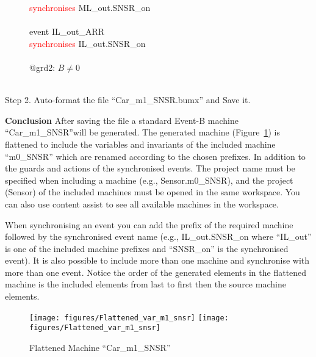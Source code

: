 \begin{description}
\begin{center}
\begin{Bcode}
			\Btab \textcolor{red}{synchronises} ML_out.SNSR_on\\
			\Btab \Bend\\
			\Btab event IL_out_ARR\\
			\Btab \textcolor{red}{synchronises} IL_out.SNSR_on\\
			\Btab \Bwhere\\
			\Btab \Btab @grd2: \(B \neq 0\)\\
			\Btab \Bend\\
			\Bend
			\endif
		\end{Bcode}
	\end{center}
	\item[Step 2. Auto-format the file ``Car\_m1\_SNSR.bumx'' and Save it.]
\end{description}
\textbf{Conclusion} After saving the file a standard Event-B machine ``Car\_m1\_SNSR''will be generated. The generated machine (Figure~\ref{fig:FlattenedMachine}) is flattened to include the variables and invariants  of the included machine ``m0\_SNSR'' which are renamed according to the chosen prefixes. In addition to the guards and actions of the synchronised events. The project name must be specified when including a machine (e.g., Sensor.m0\_SNSR), and the project (Sensor) of the included machines must be opened in the same workspace. You can also use content assist to see all available machines in the workspace.

When synchronising an event you can add the prefix of the required machine followed by the synchronised event name (e.g., IL\_out.SNSR\_on where ``IL\_out'' is one of the included machine prefixes and ``SNSR\_on'' is the synchronised event). It is also possible to include more than one machine and synchronise with more than one event. Notice the order of the generated elements in the flattened machine is the included elements from last to first then the source machine elements.

\begin{figure}[!htbp]
	\centering
	\texttt{[image: figures/Flattened\_var\_m1\_snsr]}
	\else
	\texttt{[image: figures/Flattened\_var\_m1\_snsr]}
	\endif
	\caption{Flattened Machine ``Car\_m1\_SNSR''}
	\label{fig:FlattenedMachine}
\end{figure}


